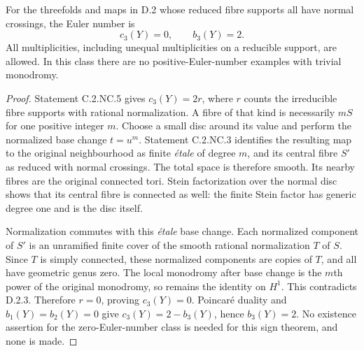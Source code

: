 \begin{theorem}
\label{st:D.2.4}
For the threefolds and maps in D.2 whose reduced fibre supports
all have normal crossings, the Euler number is
\[
c_3(Y)=0,\qquad b_3(Y)=2.
\]
All multiplicities, including unequal multiplicities on a
reducible support, are allowed. In this class there are no
positive-Euler-number examples with trivial monodromy.
\end{theorem}
\begin{proof}
Statement C.2.NC.5 gives $c_3(Y)=2r$, where $r$ counts the
irreducible fibre supports with rational normalization. A fibre
of that kind is necessarily $mS$ for one positive integer $m$.
Choose a small disc around its value and perform the normalized
base change $t=u^m$. Statement C.2.NC.3 identifies the resulting
map to the original neighbourhood as finite \emph{\'etale} of
degree $m$, and its central fibre $S'$ as reduced with normal
crossings. The total space is therefore smooth. Its nearby
fibres are the original connected tori. Stein factorization
over the normal disc shows that its central fibre is connected
as well: the finite Stein factor has generic degree one and is
the disc itself.

Normalization commutes with this \emph{\'etale} base change.
Each normalized component of $S'$ is an unramified finite cover
of the smooth rational normalization $T$ of $S$. Since $T$ is
simply connected, these normalized components are copies of
$T$, and all have geometric genus zero. The local monodromy
after base change is the $m$th power of the original monodromy,
so remains the identity on $H^1$. This contradicts D.2.3.
Therefore $r=0$, proving $c_3(Y)=0$. Poincar\'e duality and
$b_1(Y)=b_2(Y)=0$ give $c_3(Y)=2-b_3(Y)$, hence $b_3(Y)=2$.
No existence assertion for the zero-Euler-number class is
needed for this sign theorem, and none is made.
\end{proof}
